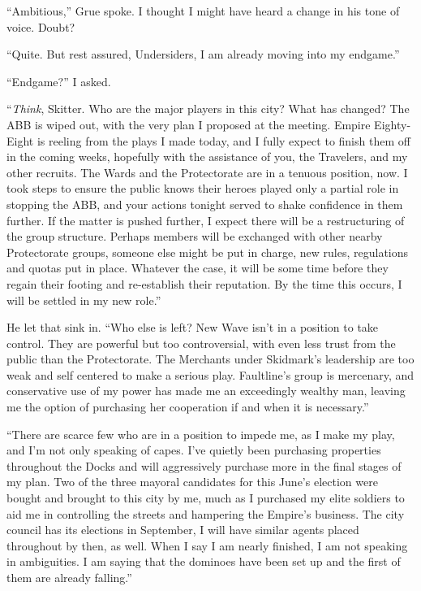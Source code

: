``Ambitious,'' Grue spoke.  I thought I might have heard a change in his tone of voice.  Doubt?



``Quite.  But rest assured, Undersiders, I am already moving into my endgame.''



``Endgame?'' I asked.



``\emph{Think}, Skitter.  Who are the major players in this city?  What has changed?  The ABB is wiped out, with the very plan I proposed at the meeting.  Empire Eighty-Eight is reeling from the plays I made today, and I fully expect to finish them off in the coming weeks, hopefully with the assistance of you, the Travelers, and my other recruits.  The Wards and the Protectorate are in a tenuous position, now.  I took steps to ensure the public knows their heroes played only a partial role in stopping the ABB, and your actions tonight served to shake confidence in them further.  If the matter is pushed further, I expect there will be a restructuring of the group structure.  Perhaps members will be exchanged with other nearby Protectorate groups, someone else might be put in charge, new rules, regulations and quotas put in place.  Whatever the case, it will be some time before they regain their footing and re-establish their reputation.  By the time this occurs, I will be settled in my new role.''



He let that sink in.  ``Who else is left?  New Wave isn't in a position to take control.  They are powerful but too controversial, with even less trust from the public than the Protectorate.  The Merchants under Skidmark's leadership are too weak and self centered to make a serious play.  Faultline's group is mercenary, and conservative use of my power has made me an exceedingly wealthy man, leaving me the option of purchasing her cooperation if and when it is necessary.''



``There are scarce few who are in a position to impede me, as I make my play, and I'm not only speaking of capes.  I've quietly been purchasing properties throughout the Docks and will aggressively purchase more in the final stages of my plan.  Two of the three mayoral candidates for this June's election were bought and brought to this city by me, much as I purchased my elite soldiers to aid me in controlling the streets and hampering the Empire's business.  The city council has its elections in September, I will have similar agents placed throughout by then, as well.  When I say I am nearly finished, I am not speaking in ambiguities.  I am saying that the dominoes have been set up and the first of them are already falling.''



